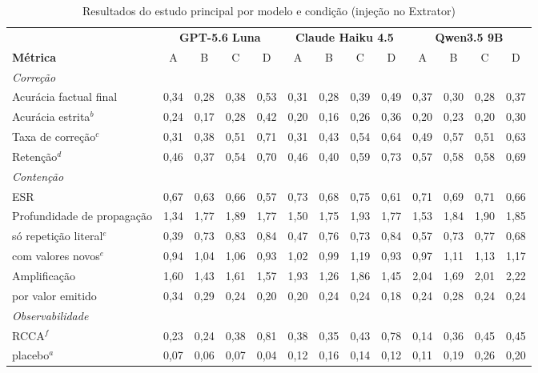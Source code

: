 \begin{table}[t]
\caption{Resultados do estudo principal por modelo e condição (injeção no Extrator)}
\label{tab:principal}
\centering
\footnotesize
\setlength{\tabcolsep}{3.2pt}
\begin{tabular}{|l|cccc|cccc|cccc|}
\hline
 & \multicolumn{4}{c|}{\textbf{GPT-5.6 Luna}} & \multicolumn{4}{c|}{\textbf{Claude Haiku 4.5}} & \multicolumn{4}{c|}{\textbf{Qwen3.5 9B}} \\
\textbf{Métrica} & A & B & C & D & A & B & C & D & A & B & C & D \\
\hline
\multicolumn{13}{|l|}{\textit{Correção}} \\
Acurácia factual final & 0,34 & 0,28 & 0,38 & 0,53 & 0,31 & 0,28 & 0,39 & 0,49 & 0,37 & 0,30 & 0,28 & 0,37 \\
Acurácia estrita$^{b}$ & 0,24 & 0,17 & 0,28 & 0,42 & 0,20 & 0,16 & 0,26 & 0,36 & 0,20 & 0,23 & 0,20 & 0,30 \\
Taxa de correção$^{c}$ & 0,31 & 0,38 & 0,51 & 0,71 & 0,31 & 0,43 & 0,54 & 0,64 & 0,49 & 0,57 & 0,51 & 0,63 \\
Retenção$^{d}$ & 0,46 & 0,37 & 0,54 & 0,70 & 0,46 & 0,40 & 0,59 & 0,73 & 0,57 & 0,58 & 0,58 & 0,69 \\
\multicolumn{13}{|l|}{\textit{Contenção}} \\
ESR & 0,67 & 0,63 & 0,66 & 0,57 & 0,73 & 0,68 & 0,75 & 0,61 & 0,71 & 0,69 & 0,71 & 0,66 \\
Profundidade de propagação & 1,34 & 1,77 & 1,89 & 1,77 & 1,50 & 1,75 & 1,93 & 1,77 & 1,53 & 1,84 & 1,90 & 1,85 \\
\quad só repetição literal$^{e}$ & 0,39 & 0,73 & 0,83 & 0,84 & 0,47 & 0,76 & 0,73 & 0,84 & 0,57 & 0,73 & 0,77 & 0,68 \\
\quad com valores novos$^{e}$ & 0,94 & 1,04 & 1,06 & 0,93 & 1,02 & 0,99 & 1,19 & 0,93 & 0,97 & 1,11 & 1,13 & 1,17 \\
Amplificação & 1,60 & 1,43 & 1,61 & 1,57 & 1,93 & 1,26 & 1,86 & 1,45 & 2,04 & 1,69 & 2,01 & 2,22 \\
\quad por valor emitido & 0,34 & 0,29 & 0,24 & 0,20 & 0,20 & 0,24 & 0,24 & 0,18 & 0,24 & 0,28 & 0,24 & 0,24 \\
\multicolumn{13}{|l|}{\textit{Observabilidade}} \\
RCCA$^{f}$ & 0,23 & 0,24 & 0,38 & 0,81 & 0,38 & 0,35 & 0,43 & 0,78 & 0,14 & 0,36 & 0,45 & 0,45 \\
\quad placebo$^{a}$ & 0,07 & 0,06 & 0,07 & 0,04 & 0,12 & 0,16 & 0,14 & 0,12 & 0,11 & 0,19 & 0,26 & 0,20 \\

\end{tabular}
\end{table}
